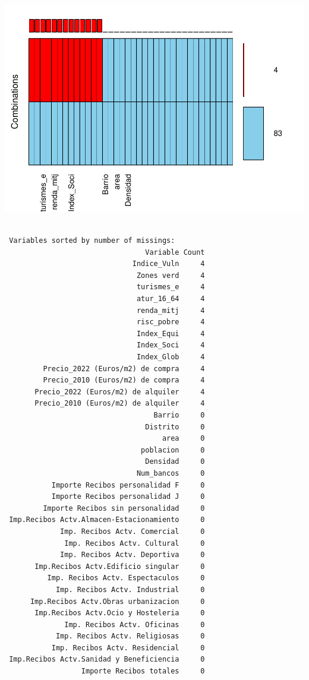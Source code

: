 \documentclass[notspecified,article,submit,moreauthors,pdftex]{Definitions/mdpi}
\begin{document}
\begin{center}\includegraphics{./figure/unnamed-chunk-33-1} \end{center}

\begin{verbatim}

 Variables sorted by number of missings: 
                                 Variable Count
                              Indice_Vuln     4
                               Zones verd     4
                               turismes_e     4
                               atur_16_64     4
                               renda_mitj     4
                               risc_pobre     4
                               Index_Equi     4
                               Index_Soci     4
                               Index_Glob     4
         Precio_2022 (Euros/m2) de compra     4
         Precio_2010 (Euros/m2) de compra     4
       Precio_2022 (Euros/m2) de alquiler     4
       Precio_2010 (Euros/m2) de alquiler     4
                                   Barrio     0
                                 Distrito     0
                                     area     0
                                poblacion     0
                                 Densidad     0
                               Num_bancos     0
           Importe Recibos personalidad F     0
           Importe Recibos personalidad J     0
         Importe Recibos sin personalidad     0
 Imp.Recibos Actv.Almacen-Estacionamiento     0
             Imp. Recibos Actv. Comercial     0
              Imp. Recibos Actv. Cultural     0
             Imp. Recibos Actv. Deportiva     0
       Imp.Recibos Actv.Edificio singular     0
          Imp. Recibos Actv. Espectaculos     0
            Imp. Recibos Actv. Industrial     0
      Imp.Recibos Actv.Obras urbanizacion     0
       Imp.Recibos Actv.Ocio y Hosteleria     0
              Imp. Recibos Actv. Oficinas     0
            Imp. Recibos Actv. Religiosas     0
           Imp. Recibos Actv. Residencial     0
 Imp.Recibos Actv.Sanidad y Beneficiencia     0
                  Importe Recibos totales     0
\end{verbatim}
\end{document}
